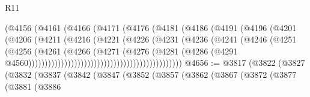 \begin{lexlean}{R11}
\begin{coremodule}
                                          (@4156
                                            (@4161
                                              (@4166
                                                (@4171
                                                  (@4176
                                                    (@4181
                                                      (@4186
                                                        (@4191
                                                          (@4196
                                                            (@4201
                                                              (@4206
                                                                (@4211
                                                                  (@4216
                                                                    (@4221
                                                                      (@4226
                                                                        (@4231
                                                                          (@4236
                                                                            (@4241
                                                                              (@4246
                                                                                (@4251
                                                                                  (@4256
                                                                                    (@4261
                                                                                      (@4266
                                                                                        (@4271
                                                                                          (@4276
                                                                                            (@4281
                                                                                              (@4286
                                                                                                (@4291
                                                                                                  @4560)))))))))))))))))))))))))))))))))))))))))))))))
@4656 := @3817
    (@3822
      (@3827
        (@3832
          (@3837
            (@3842
              (@3847
                (@3852
                  (@3857
                    (@3862
                      (@3867
                        (@3872
                          (@3877
                            (@3881
                              (@3886

\end{coremodule}
\end{lexlean}
